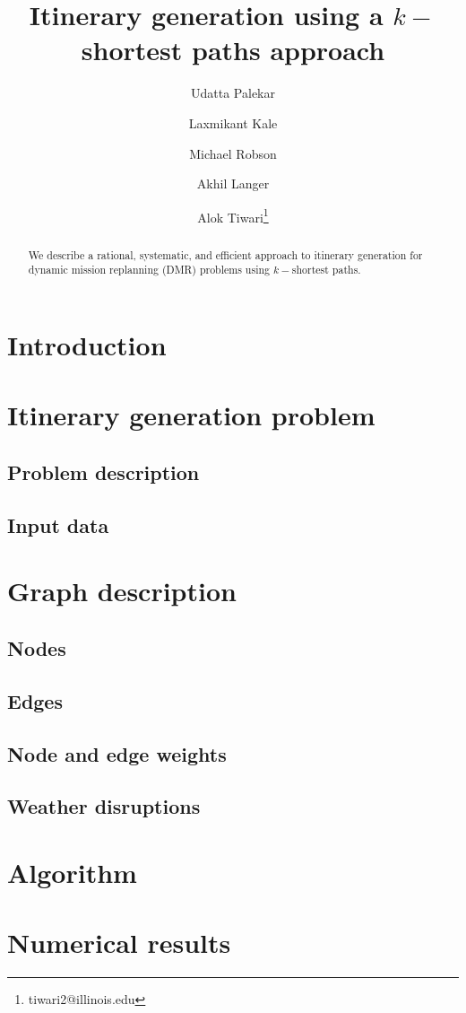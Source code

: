 \documentclass[10pt]{article}
\begin{document}
\title{Itinerary generation using a $k-$shortest paths approach}

\author[1]{Udatta Palekar}
\author[2]{Laxmikant Kale}
\author[2]{Michael Robson}
\author[2]{Akhil Langer}
\author[3]{Alok Tiwari\thanks{tiwari2@illinois.edu}}


\renewcommand\Authands{, and }


\maketitle
\begin{abstract}
We describe a rational, systematic, and efficient approach to itinerary generation for dynamic mission replanning (DMR) problems using $k-$shortest paths. 
\end{abstract}

\section{Introduction}\label{sec:intro}

\section{Itinerary generation problem}\label{sec:problem}
\subsection{Problem description}\label{subsec:desc}

\subsection{Input data}\label{subsec:data}

\section{Graph description}\label{sec:graph}
\subsection{Nodes}\label{subsec:nodes}

\subsection{Edges}\label{subsec:edges}

\subsection{Node and edge weights}\label{subsec:weights}

\subsection{Weather disruptions}\label{subsec:weather}

\section{Algorithm}\label{sec:algorithm}

\section{Numerical results}\label{sec:numerics}

\end{document}
